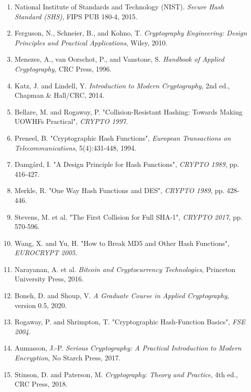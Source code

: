 \documentclass[a4paper, 11pt]{article}
\begin{document}
\begin{enumerate}
\item National Institute of Standards and Technology (NIST). \textit{Secure Hash Standard (SHS)}, FIPS PUB 180-4, 2015.
\item Ferguson, N., Schneier, B., and Kohno, T. \textit{Cryptography Engineering: Design Principles and Practical Applications}, Wiley, 2010.
\item Menezes, A., van Oorschot, P., and Vanstone, S. \textit{Handbook of Applied Cryptography}, CRC Press, 1996.
\item Katz, J. and Lindell, Y. \textit{Introduction to Modern Cryptography}, 2nd ed., Chapman \& Hall/CRC, 2014.
\item Bellare, M. and Rogaway, P. "Collision-Resistant Hashing: Towards Making UOWHFs Practical", \textit{CRYPTO 1997}.
\item Preneel, B. "Cryptographic Hash Functions", \textit{European Transactions on Telecommunications}, 5(4):431-448, 1994.
\item Damg\r{a}rd, I. "A Design Principle for Hash Functions", \textit{CRYPTO 1989}, pp. 416-427.
\item Merkle, R. "One Way Hash Functions and DES", \textit{CRYPTO 1989}, pp. 428-446.
\item Stevens, M. et al. "The First Collision for Full SHA-1", \textit{CRYPTO 2017}, pp. 570-596.
\item Wang, X. and Yu, H. "How to Break MD5 and Other Hash Functions", \textit{EUROCRYPT 2005}.
\item Narayanan, A. et al. \textit{Bitcoin and Cryptocurrency Technologies}, Princeton University Press, 2016.
\item Boneh, D. and Shoup, V. \textit{A Graduate Course in Applied Cryptography}, version 0.5, 2020.
\item Rogaway, P. and Shrimpton, T. "Cryptographic Hash-Function Basics", \textit{FSE 2004}.
\item Aumasson, J.-P. \textit{Serious Cryptography: A Practical Introduction to Modern Encryption}, No Starch Press, 2017.
\item Stinson, D. and Paterson, M. \textit{Cryptography: Theory and Practice}, 4th ed., CRC Press, 2018.
\end{enumerate}
\end{document}
